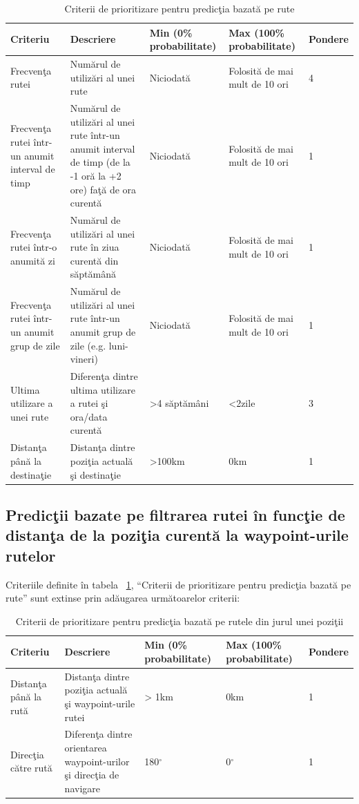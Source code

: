 		\begin{table}[!h]
		\caption{Criterii de prioritizare pentru predicţia bazată pe rute}
		\centering
		\begin{tabular}{ | m{} | m{} | m{3,22cm} | m{} | m{} | }
		\hline
		\textbf{Criteriu} & \textbf{Descriere} & \textbf{Min (0\% probabilitate)} & \textbf{Max (100\% probabilitate)} & \textbf{Pondere} \\ 
		\hline
		 Frecvenţa rutei & Numărul de utilizări al unei rute & Niciodată & Folosită de mai mult de 10 ori & 4 \\
		\hline
		 Frecvenţa rutei într-un anumit interval de timp & Numărul de utilizări al unei rute într-un anumit interval de timp (de la -1 oră la +2 ore) faţă de ora curentă & Niciodată & Folosită de mai mult de 10 ori & 1 \\
		\hline
		 Frecvenţa rutei într-o anumită zi & Numărul de utilizări al unei rute în ziua curentă din săptămână & Niciodată & Folosită de mai mult de 10 ori & 1 \\
		\hline
		 Frecvenţa rutei într-un anumit grup de zile & Numărul de utilizări al unei rute într-un anumit grup de zile (e.g. luni-vineri)& Niciodată &  Folosită de mai mult de 10 ori  & 1 \\
		\hline
		 Ultima utilizare a unei rute & Diferenţa dintre ultima utilizare a rutei şi ora/data curentă & >4 săptămâni & <2zile & 3 \\
		\hline
		 Distanţa până la destinaţie & Distanţa dintre poziţia actuală şi destinaţie & >100km & 0km & 1 \\
		\hline
		\end{tabular}
		\label{table:tabel_predictii}
		\end{table}
		
		
		\subsection{Predicţii bazate pe filtrarea rutei în funcţie de distanţa de la poziţia curentă la waypoint-urile rutelor}
		Criteriile definite în tabela ~\ref{table:tabel_predictii}, ``Criterii de prioritizare pentru predicţia bazată pe rute'' sunt extinse prin adăugarea următoarelor criterii:
		
		\begin{table}[!h]
		\caption{Criterii de prioritizare pentru predicţia bazată pe rutele din jurul unei poziţii}
		\centering
		\begin{tabular}{ | m{} | m{} | m{3,22cm} | m{} | m{} | }
		\hline
		\textbf{Criteriu} & \textbf{Descriere} & \textbf{Min (0\% probabilitate)} & \textbf{Max (100\% probabilitate)} & \textbf{Pondere} \\ 
		\hline
		 Distanţa până la rută & Distanţa dintre poziţia actuală şi waypoint-urile rutei &> 1km & 0km & 1 \\
		\hline
		 Direcţia către rută & Diferenţa dintre orientarea waypoint-urilor şi direcţia de navigare & 180$^{\circ}$ & 0$^{\circ}$ & 1 \\
		\hline
		\end{tabular}
		\end{table}
		
